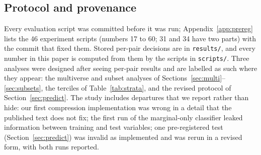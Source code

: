 \subsection{Protocol and provenance}\label{sec:protocol}
Every evaluation script was committed before it was run; Appendix~\ref{app:prereg} lists the 46 experiment scripts (numbers 17 to 60; 31 and 34 have two parts) with the commit that fixed them. Stored per-pair decisions are in \texttt{results/}, and every number in this paper is computed from them by the scripts in \texttt{scripts/}. Three analyses were designed after seeing per-pair results and are labelled as such where they appear: the multiverse and subset analyses of Sections~\ref{sec:multi}--\ref{sec:subsets}, the terciles of Table~\ref{tab:strata}, and the revised protocol of Section~\ref{sec:predict}. The study includes departures that we report rather than hide: our first compression implementation was wrong in a detail that the published text does not fix; the first run of the marginal-only classifier leaked information between training and test variables; one pre-registered test (Section~\ref{sec:predict}) was invalid as implemented and was rerun in a revised form, with both runs reported.
